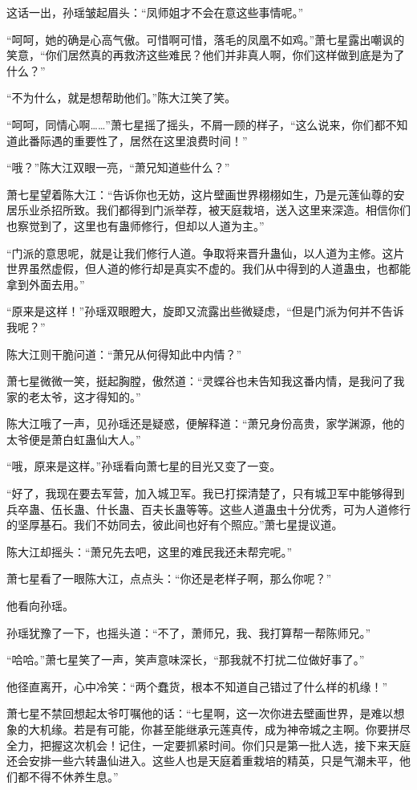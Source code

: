 \begin{this_body}
这话一出，孙瑶皱起眉头：“凤师姐才不会在意这些事情呢。”

“呵呵，她的确是心高气傲。可惜啊可惜，落毛的凤凰不如鸡。”萧七星露出嘲讽的笑意，“你们居然真的再救济这些难民？他们并非真人啊，你们这样做到底是为了什么？”

“不为什么，就是想帮助他们。”陈大江笑了笑。

“呵呵，同情心啊……”萧七星摇了摇头，不屑一顾的样子，“这么说来，你们都不知道此番际遇的重要性了，居然在这里浪费时间！”

“哦？”陈大江双眼一亮，“萧兄知道些什么？”

萧七星望着陈大江：“告诉你也无妨，这片壁画世界栩栩如生，乃是元莲仙尊的安居乐业杀招所致。我们都得到门派举荐，被天庭栽培，送入这里来深造。相信你们也察觉到了，这里也有蛊师修行，但却以人道为主。”

“门派的意思呢，就是让我们修行人道。争取将来晋升蛊仙，以人道为主修。这片世界虽然虚假，但人道的修行却是真实不虚的。我们从中得到的人道蛊虫，也都能拿到外面去用。”

“原来是这样！”孙瑶双眼瞪大，旋即又流露出些微疑虑，“但是门派为何并不告诉我呢？”

陈大江则干脆问道：“萧兄从何得知此中内情？”

萧七星微微一笑，挺起胸膛，傲然道：“灵蝶谷也未告知我这番内情，是我问了我家的老太爷，这才得知的。”

陈大江哦了一声，见孙瑶还是疑惑，便解释道：“萧兄身份高贵，家学渊源，他的太爷便是萧白虹蛊仙大人。”

“哦，原来是这样。”孙瑶看向萧七星的目光又变了一变。

“好了，我现在要去军营，加入城卫军。我已打探清楚了，只有城卫军中能够得到兵卒蛊、伍长蛊、什长蛊、百夫长蛊等等。这些人道蛊虫十分优秀，可为人道修行的坚厚基石。我们不妨同去，彼此间也好有个照应。”萧七星提议道。

陈大江却摇头：“萧兄先去吧，这里的难民我还未帮完呢。”

萧七星看了一眼陈大江，点点头：“你还是老样子啊，那么你呢？”

他看向孙瑶。

孙瑶犹豫了一下，也摇头道：“不了，萧师兄，我、我打算帮一帮陈师兄。”

“哈哈。”萧七星笑了一声，笑声意味深长，“那我就不打扰二位做好事了。”

他径直离开，心中冷笑：“两个蠢货，根本不知道自己错过了什么样的机缘！”

萧七星不禁回想起太爷叮嘱他的话：“七星啊，这一次你进去壁画世界，是难以想象的大机缘。若是有可能，你甚至能继承元莲真传，成为神帝城之主啊。你要拼尽全力，把握这次机会！记住，一定要抓紧时间。你们只是第一批人选，接下来天庭还会安排一些六转蛊仙进入。这些人也是天庭着重栽培的精英，只是气潮未平，他们都不得不休养生息。”


\end{this_body}
